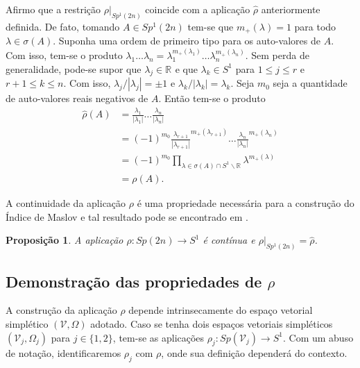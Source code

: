 \documentclass[12pt]{book}
\newtheorem{proposicao}[teorema]{Proposição}
\newcommand{\circulo}{S^{1}}
\newcommand{\complementar}[2]{#1 \backslash #2}
\newcommand{\complexificado}[1]{\mathcal{#1}}
\newcommand{\espectrooperador}[1]{\sigma(#1)}
\newcommand{\gruposimpletico}[1]{Sp(#1)}
\newcommand{\gruposimpleticoespecial}[1]{Sp^{1}(#1)}
\newcommand{\real}[1]{\mathbb{R}^{#1}}
\newcommand{\reta}{\real{}}
\begin{document}
	Afirmo que a restrição $\rho|_{\gruposimpleticoespecial{2n}}$ coincide com a aplicação $\hat{\rho}$ anteriormente definida. De fato, tomando $A \in \gruposimpleticoespecial{2n}$ tem-se que $m_{+}(\lambda) = 1$ para todo $\lambda\in \espectrooperador{A}$. Suponha uma ordem de primeiro tipo para os auto-valores de $A$. Com isso, tem-se o produto $\lambda_{1}\dots \lambda_{n} = \lambda_{1}^{m_{+}(\lambda_{1})}\dots \lambda_{n}^{m_{+}(\lambda_{n})}$. Sem perda de generalidade, pode-se supor que $\lambda_{j} \in \reta$ e que $\lambda_{k}\in \circulo$ para $1\leq j \leq r $ e $r +1\leq k \leq n$. Com isso, $\lambda_{j}/|\lambda_{j}|=\pm 1$ e $\lambda_{k}/|\lambda_{k}| = \lambda_{k}$. Seja $m_{0}$ seja a quantidade de auto-valores reais negativos de $A$. Então tem-se o produto 
	$$
	\begin{aligned}
	\hat{\rho}(A) 
	&=
	\frac{\lambda_{1}}{|\lambda_{1}|}\dots \frac{\lambda_{n}}{|\lambda_{n}|}
	\\
	&= (-1)^{m_{0}}\frac{\lambda_{r+1}}{|\lambda_{r+1}|}^{m_{+}(\lambda_{r+1})} \dots \frac{\lambda_{n}}{|\lambda_{n}|}^{m_{+}(\lambda_{n})}
	\\
	&=(-1)^{m_{0}}\prod_{\lambda\in \espectrooperador{A}\cap\complementar{\circulo}{\reta}}\lambda^{m_{+}(\lambda)}
	\\
	&= \rho(A).
	\end{aligned}
	$$

	A continuidade da aplicação $\rho$ é uma propriedade necessária para a construção do Índice de Maslov e tal resultado pode se encontrado em \cite{audi_floer_homology}.
	
	\begin{proposicao}\label{proposicao_continuidade_rho}
		A aplicação $\rho: \gruposimpletico{2n}\to \circulo$ é contínua e $\rho|_{\gruposimpleticoespecial{2n}} = \hat{\rho}$.
	\end{proposicao}
	
	\subsection*{Demonstração das propriedades de $\rho$}
	
	A construção da aplicação $\rho$ depende intrinsecamente do espaço vetorial simplético $(\complexificado{V}, \Omega)$ adotado. Caso se tenha dois espaços vetoriais simpléticos $(\complexificado{V}_{j}, \Omega_{j})$ para $j\in \{1,2\}$, tem-se as aplicações $\rho_{j}:\gruposimpletico{\complexificado{V}_{j}} \to \circulo$. Com um abuso de notação, identificaremos $\rho_{j}$ com $\rho$, onde sua definição dependerá do contexto.
	
\end{document}
